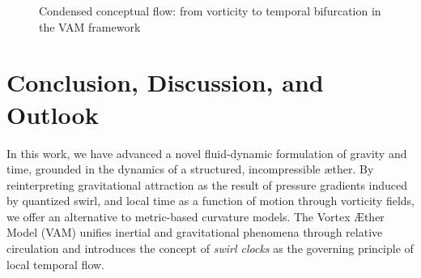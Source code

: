 \documentclass[12pt]{article}
\begin{document}
    \begin{figure}[h]
        \centering
        \caption{Condensed conceptual flow: from vorticity to temporal bifurcation in the VAM framework}
    \end{figure}

    \section{Conclusion, Discussion, and Outlook}

    In this work, we have advanced a novel fluid-dynamic formulation of gravity and time, grounded in the dynamics of a structured, incompressible æther. By reinterpreting gravitational attraction as the result of pressure gradients induced by quantized swirl, and local time as a function of motion through vorticity fields, we offer an alternative to metric-based curvature models. The Vortex Æther Model (VAM) unifies inertial and gravitational phenomena through relative circulation and introduces the concept of \emph{swirl clocks} as the governing principle of local temporal flow.
\end{document}
